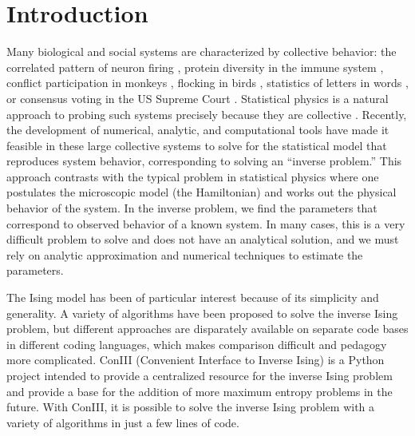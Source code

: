 \documentclass[aps,prl,twocolumn,nofootinbib]{revtex4-1}
\begin{document}
\section{Introduction}
Many biological and social systems are characterized by collective behavior: the correlated pattern of neuron firing \cite{Schneidman:2006he}, protein diversity in the immune system \cite{Mora:2010jxa}, conflict participation in monkeys \cite{Daniels:2017cq}, flocking in birds \cite{Bialek:2012cs}, statistics of letters in words \cite{Stephens:2010hi}, or consensus voting in the US Supreme Court \cite{Lee:2015ev}. Statistical physics is a natural approach to probing such systems precisely because they are collective \cite{Castellano:2009ce}.
Recently, the development of numerical, analytic, and computational tools have made it feasible in these large collective systems to solve for the statistical model that reproduces system behavior, corresponding to solving an ``inverse problem.''
This approach contrasts with the typical problem in statistical physics where one postulates the microscopic model (the Hamiltonian) and works out the physical behavior of the system. In the inverse problem, we  find the parameters that correspond to observed behavior of a known system. In many cases, this is a very difficult problem to solve and does not have an analytical solution, and we must rely on analytic approximation and numerical techniques to estimate the parameters.

The Ising model has been of particular interest because of its simplicity and generality. A variety of algorithms have been proposed to solve the inverse Ising problem, but different approaches are disparately available on separate code bases in different coding languages, which makes comparison difficult and pedagogy more complicated.
ConIII (Convenient Interface to Inverse Ising) is a Python project intended to provide a centralized resource for the inverse Ising problem and provide a base for the addition of more maximum entropy problems in the future. With ConIII, it is possible to solve the inverse Ising problem with a variety of algorithms in just a few lines of code.
\end{document}
